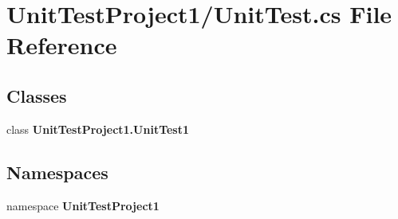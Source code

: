 \section{Unit\+Test\+Project1/\+Unit\+Test.cs File Reference}
\label{UnitTest_8cs}
\subsection*{Classes}
\begin{DoxyCompactItemize}
\item 
class \textbf{ Unit\+Test\+Project1.\+Unit\+Test1}
\end{DoxyCompactItemize}
\subsection*{Namespaces}
\begin{DoxyCompactItemize}
\item 
namespace \textbf{ Unit\+Test\+Project1}
\end{DoxyCompactItemize}
